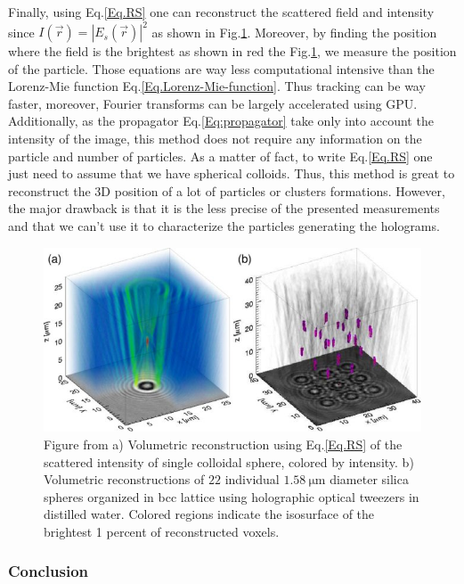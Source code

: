 Finally, using Eq.\ref{Eq.RS} one can reconstruct the scattered field and intensity since $I(\vec{r}) = |E_s(\vec{r})|^2$ as shown in Fig.\ref{fig.sommerfeld}. Moreover, by finding the position where the field is the brightest as shown in red the Fig.\ref{fig.sommerfeld}, we measure the position of the particle.
Those equations are way less computational intensive than the Lorenz-Mie function Eq.\ref{Eq.Lorenz-Mie-function}. Thus tracking can be way faster, moreover, Fourier transforms can be largely accelerated using GPU. Additionally, as the propagator Eq.\ref{Eq:propagator} take only into account the intensity of the image, this method does not require any information on the particle and number of particles. As a matter of fact,   to write Eq.\ref{Eq.RS} one just need to assume that we have spherical colloids. Thus, this method is great to reconstruct the 3D position of a lot of particles or clusters formations. However, the major drawback is that it is the less precise of the presented measurements and that we can't use it to characterize the particles generating the holograms.

\begin{figure}[!ht]
	\centering
	\includegraphics[scale=2]{02_body/chapter2/images/sommerfel_demo.jpg}
	\caption{Figure from \cite{cheong_strategies_2010} a) Volumetric reconstruction using Eq.\ref{Eq.RS} of the scattered intensity of single colloidal sphere, colored by intensity. b) Volumetric reconstructions of $22$ individual $1.58 ~ \mathrm{\mu m}$ diameter silica spheres organized in bcc lattice using holographic optical tweezers in distilled water. Colored regions indicate the isosurface of the brightest 1 percent of reconstructed voxels.}
	\label{fig.sommerfeld}
\end{figure}



\subsubsection{Conclusion}

